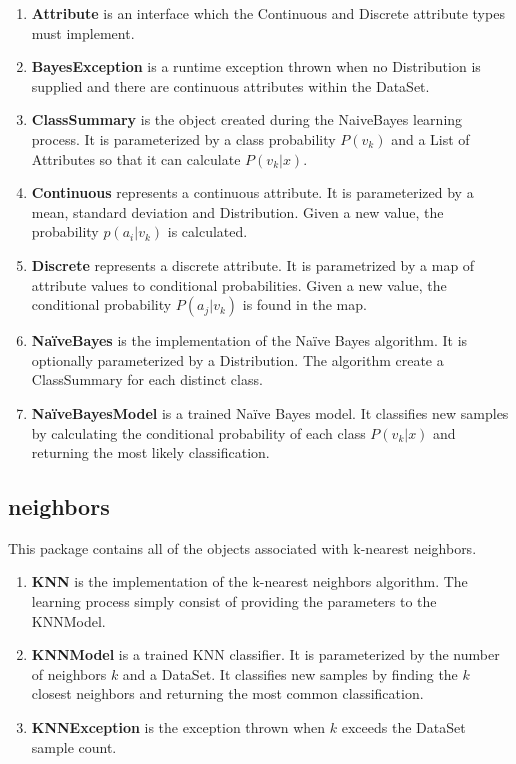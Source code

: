 \documentclass[11pt,titlepage]{article}
\newcommand{\bb}{\textbf}
\begin{document}
\begin{enumerate}[leftmargin=*]
  \item[] \bb{Attribute} is an interface which the Continuous and Discrete attribute types must implement.
  \item[] \bb{BayesException} is a runtime exception thrown when no Distribution is supplied and there are continuous attributes within the DataSet.
  \item[] \bb{ClassSummary} is the object created during the NaiveBayes learning process. It is parameterized by a class probability $P(v_k)$ and a List of Attributes so that it can calculate $P(v_k|x)$.
  \item[] \bb{Continuous} represents a continuous attribute. It is parameterized by a mean, standard deviation and Distribution. Given a new value, the probability $p(a_i|v_k)$ is calculated.
  \item[] \bb{Discrete} represents a discrete attribute. It is parametrized by a map of attribute values to conditional probabilities. Given a new value, the conditional probability $P(a_j|v_k)$ is found in the map.
  \item[] \bb{NaïveBayes} is the implementation of the Naïve Bayes algorithm. It is optionally parameterized by a Distribution. The algorithm create a ClassSummary for each distinct class.
  \item[] \bb{NaïveBayesModel} is a trained Naïve Bayes model. It classifies new samples by calculating the conditional probability of each class $P(v_k|x)$ and returning the most likely classification.
\end{enumerate}

\subsection{neighbors}
This package contains all of the objects associated with k-nearest neighbors.

\begin{enumerate}[leftmargin=*]
  \item[] \bb{KNN} is the implementation of the k-nearest neighbors algorithm. The learning process simply consist of providing the parameters to the KNNModel.
  \item[] \bb{KNNModel} is a trained KNN classifier. It is parameterized by the number of neighbors $k$ and a DataSet. It classifies new samples by finding the $k$ closest neighbors and returning the most common classification.
  \item[] \bb{KNNException} is the exception thrown when $k$ exceeds the DataSet sample count.
\end{enumerate}
\end{document}

